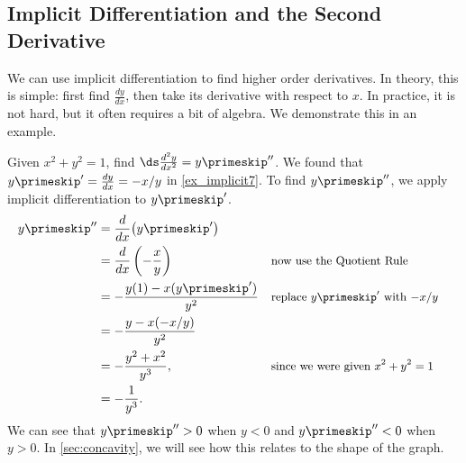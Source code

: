 %
%
%

\subsection{Implicit Differentiation and the Second Derivative}

We can use implicit differentiation to find higher order derivatives. In theory, this is simple: first find $\frac{dy}{dx}$, then take its derivative with respect to $x$. In practice, it is not hard, but it often requires a bit of algebra. We demonstrate this in an example.

\begin{example}\label{ex_implicit9}
Given $x^2+y^2=1$, find $\ds\frac{d^2y}{dx^2} = y\primeskip''$.
\solution
We found that $y\primeskip' = \frac{dy}{dx} = -x/y$ in \autoref{ex_implicit7}. To find $y\primeskip''$, we apply implicit differentiation to $y\primeskip'$.
\begin{align*}
	y\primeskip''
	&= \frac{d}{dx}\bigl(y\primeskip'\bigr) \\
	&= \frac{d}{dx}\left(-\frac xy\right) && \text{\small now use the Quotient Rule} \\
	&= -\frac{y(1) - x(y\primeskip')}{y^2} && \text{\small replace $y\primeskip'$ with $-x/y$} \\
	&= -\frac{y-x(-x/y)}{y^2}\\
	&= -\frac{y^2+x^2}{y^3}, && \text{\small since we were given $x^2+y^2=1$} \\
	&= -\frac1{y^3}.
\end{align*}
We can see that $y\primeskip''>0$ when $y<0$ and $y\primeskip''<0$ when $y>0$. In \autoref{sec:concavity}, we will see how this relates to the shape of the graph.
\end{example}

